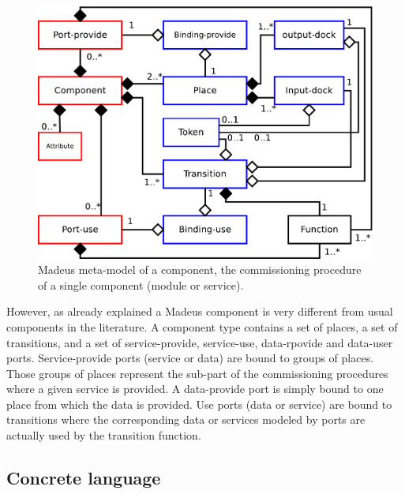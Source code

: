 \begin{figure}[tbp]
  \begin{center}
    \includegraphics[width=0.9\linewidth]{./images/component_uml.pdf}
  \end{center}
  \caption{Madeus meta-model of a component, \ie the commissioning
    procedure of a single component (\ie module or service).}
  \label{fig:mmcomp}
\end{figure}

However, as already explained a Madeus component is very different
from usual components in the literature. A component type contains a
set of places, a set of transitions, and a set of service-provide,
service-use, data-rpovide and data-user ports.
Service-provide ports (service or data) are bound to groups of
places. Those groups of places represent the sub-part of the
commissioning procedures where a given service is provided. A
data-provide port is simply bound to one place from which the data is
provided. Use ports (data or service) are bound to transitions where
the corresponding data or services modeled by ports are actually used
by the transition function.

\subsection{Concrete language}


